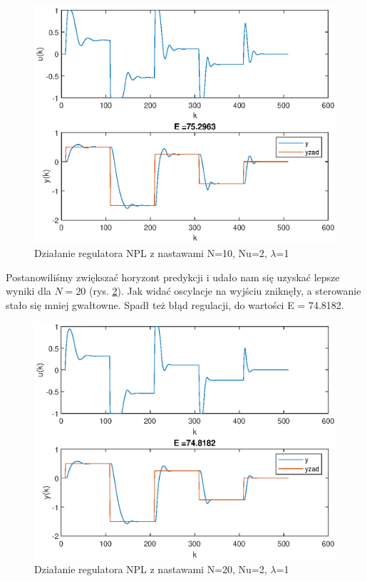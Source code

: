		\begin{figure}[h!]
			\centering
			\includegraphics[width=0.7\linewidth]{img/strojenieNPL_N_10_Nu_2_lam_1.eps}
			\caption{Działanie regulatora NPL z nastawami N=10, Nu=2, $\lambda$=1}
			\label{fig:NPL0}
		\end{figure}
		
		Postanowiliśmy zwiększać horyzont predykcji i udało nam się uzyskać lepsze wyniki dla $N=20$ (rys. \ref{fig:NPL1}). Jak widać oscylacje na wyjściu zniknęły, a sterowanie stało się mniej gwałtowne. Spadł też błąd regulacji, do wartości E = 74.8182.
		\begin{figure}[h!]
			\centering
			\includegraphics[width=0.7\linewidth]{img/NPLN20.eps}
			\caption{Działanie regulatora NPL z nastawami N=20, Nu=2, $\lambda$=1}
			\label{fig:NPL1}
		\end{figure}
		

